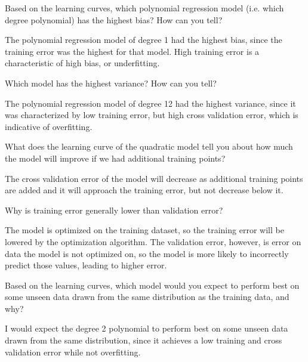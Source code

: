 \begin{problem}[3]
  Based on the learning curves, which polynomial regression model (i.e. which degree polynomial) has the highest bias? How can you tell?
\end{problem}
\begin{solution}
  The polynomial regression model of degree 1 had the highest bias, since the training error was the highest for that model. High training error is a characteristic of high bias, or underfitting.
\end{solution}

\begin{problem}[3]
  Which model has the highest variance? How can you tell?
\end{problem}
\begin{solution}
  The polynomial regression model of degree 12 had the highest variance, since it was characterized by low training error, but high cross validation error, which is indicative of overfitting.
\end{solution}

\newpage

\begin{problem}[3]
  What does the learning curve of the quadratic model tell you about how much the model will improve if we had additional training points?
\end{problem}
\begin{solution}
  The cross validation error of the model will decrease as additional training points are added and it will approach the training error, but not decrease below it.
\end{solution}

\begin{problem}[3]
  Why is training error generally lower than validation error?
\end{problem}
\begin{solution}
  The model is optimized on the training dataset, so the training error will be lowered by the optimization algorithm. The validation error, however, is error on data the model is not optimized on, so the model is more likely to incorrectly predict those values, leading to higher error.
\end{solution}

\begin{problem}[3]
  Based on the learning curves, which model would you expect to perform best on some unseen data drawn from the same distribution as the training data, and why?
\end{problem}
\begin{solution}
  I would expect the degree 2 polynomial to perform best on some unseen data drawn from the same distribution, since it achieves a low training and cross validation error while not overfitting.
\end{solution}

